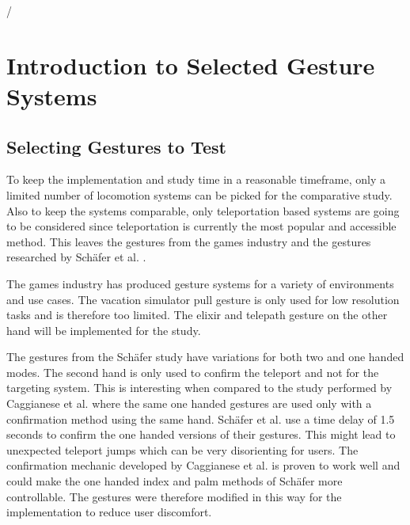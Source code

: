 /\chapter{Introduction to Selected Gesture Systems} %
\label{cha:Introduction to Selected Gesture Systems}

\section{Selecting Gestures to Test}

To keep the implementation and study time in a reasonable timeframe, only a limited number of locomotion systems can be picked for the comparative study. Also to keep the systems comparable, only teleportation based systems are going to be considered since teleportation is currently the most popular and accessible method. This leaves the gestures from the games industry and the gestures researched by Schäfer et al. \cite{Schafer2021}. 

The games industry has produced gesture systems for a variety of environments and use cases. The vacation simulator pull gesture is only used for low resolution tasks and is therefore too limited. The elixir and telepath gesture on the other hand will be implemented for the study.

The gestures from the Schäfer study have variations for both two and one handed modes. The second hand is only used to confirm the teleport and not for the targeting system. 
This is interesting when compared to the study performed by Caggianese et al. \cite{Caggianese} where the same one handed gestures are used only with a confirmation method using the same hand. Schäfer et al. use a time delay of 1.5 seconds to confirm the one handed versions of their gestures. This might lead to unexpected teleport jumps which can be very disorienting for users. The confirmation mechanic developed by Caggianese et al. is proven to work well and could make the one handed index and palm methods of Schäfer more controllable. The gestures were therefore modified in this way for the implementation to reduce user discomfort.

